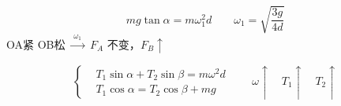 \[ mg\tan\alpha=m\omega_1^2d\qquad \omega_1=\sqrt{\dfrac{3g}{4d}} \]
OA紧 OB松 $\xrightarrow{\ \omega_1\ }$ $F_A$ 不变，$F_B\uparrow$

\[
\left\{\begin{aligned}
&T_1\sin\alpha+T_2\sin\beta=m\omega^2d\\
&T_1\cos\alpha=T_2\cos\beta+mg
\end{aligned}\right.
\qquad \omega\uparrow\quad T_1\uparrow\quad T_2\uparrow
\]
